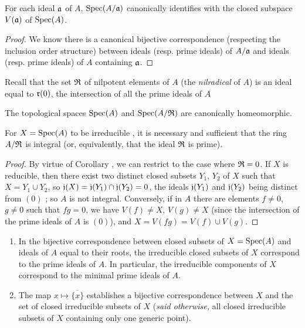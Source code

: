 \begin{prop}[1.1.11]
\label{1.1.1.11}
For each ideal $\mathfrak{a}$ of $A$, ${\mathop{\mathrm{Spec}}\nolimits}(A/\mathfrak{a})$ canonically identifies with the
closed subspace $V(\mathfrak{a})$ of ${\mathop{\mathrm{Spec}}\nolimits}(A)$.
\end{prop}

\begin{proof}
\label{proof-1.1.1.11}
We know there is a canonical bijective correspondence (respecting the inclusion order
structure) between ideals (resp. prime ideals) of $A/\mathfrak{a}$ and ideals (resp. prime
ideals) of $A$ containing $\mathfrak{a}$.
\end{proof}

Recall that the set $\mathfrak{R}$ of nilpotent elements of $A$ (the \emph{nilradical} of $A$) is
an ideal equal to $\mathfrak{r}(0)$, the intersection of all the prime ideals of $A$

\begin{cor}[1.1.12]
\label{1.1.1.12}
The topological spaces ${\mathop{\mathrm{Spec}}\nolimits}(A)$ and ${\mathop{\mathrm{Spec}}\nolimits}(A/\mathfrak{R})$ are canonically homeomorphic.
\end{cor}

\begin{prop}[1.1.13]
\label{1.1.1.13}
For $X={\mathop{\mathrm{Spec}}\nolimits}(A)$ to be irreducible , it is necessary and
sufficient that the ring $A/\mathfrak{R}$ is integral (or, equivalently, that the ideal $\mathfrak{R}$ is prime).
\end{prop}

\begin{proof}
\label{proof-1.1.1.13}
By virtue of Corollary , we can restrict to the case where
$\mathfrak{R}=0$. If $X$ is reducible, then there exist two distinct closed subsets $Y_1$, $Y_2$
of $X$ such that $X=Y_1\cup Y_2$, so $\mathfrak{j}(X)=\mathfrak{j}(Y_1)\cap\mathfrak{j}(Y_2)=0$,
the ideals $\mathfrak{j}(Y_1)$ and $\mathfrak{j}(Y_2)$ being distinct from $(0)$
; so $A$ is not integral. Conversely, if in $A$ there are
elements $f\neq 0$, $g\neq 0$ such that $fg=0$, we have $V(f)\neq X$, $V(g)\neq X$ (since the
intersection of the prime ideals of $A$ is $(0)$), and $X=V(fg)=V(f)\cup V(g)$.
\end{proof}

\begin{cor}[1.1.14]
\label{1.1.1.14}
\medskip\noindent
\begin{enumerate}[label=\emph{(\roman*)}]
  \item In the bijective correspondence between closed subsets of $X={\mathop{\mathrm{Spec}}\nolimits}(A)$ and ideals of $A$ equal to their roots, the irreducible closed subsets of $X$ correspond to the prime ideals of $A$.
    In particular, the irreducible components of $X$ correspond to the minimal prime ideals of $A$.
  \item The map $x\mapsto\overline{\{x\}}$ establishes a bijective correspondence between $X$ and the set of closed irreducible subsets of $X$ (\emph{said otherwise,} all closed irreducible subsets of $X$ containing only one generic point).
\end{enumerate}
\end{cor}

